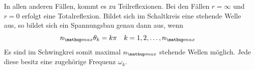 In allen anderen Fällen, kommt es zu Teilreflexionen.
Bei den Fällen $r=\infty$ und $r=0$ erfolgt eine Totalreflexion.
Bildet sich im Schaltkreis eine stehende Welle aus, so bildet sich ein Spannungsbau genau dann aus, wenn
\begin{equation}
\label{eq:spannungsbauch}
n\ua{max}\theta_k=k\pi \quad k=1,2,\dots,n\ua{max}
\end{equation}
Es sind im Schwingkrei somit maximal $n\ua{max}$ stehende Wellen möglich.
Jede diese besitz eine zugehörige Frequenz $\omega_k$.
